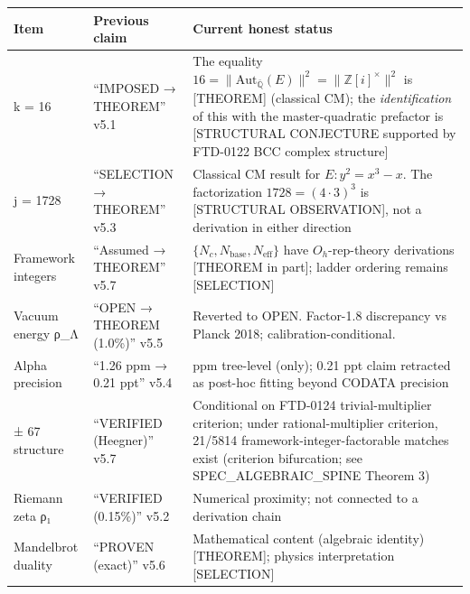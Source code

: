 \documentclass[
  11pt,
  letterpaper,
  twoside,
  openany]{book}
\begin{document}
\begin{longtable}[]{@{}
  >{\raggedright\arraybackslash}p{}
  >{\raggedright\arraybackslash}p{}
  >{\raggedright\arraybackslash}p{}@{}}
\toprule\noalign{}
\begin{minipage}[b]{\linewidth}\raggedright
Item
\end{minipage} & \begin{minipage}[b]{\linewidth}\raggedright
Previous claim
\end{minipage} & \begin{minipage}[b]{\linewidth}\raggedright
Current honest status
\end{minipage} \\
\midrule\noalign{}
\endhead
\bottomrule\noalign{}
\endlastfoot
k = 16 & ``IMPOSED → THEOREM'' v5.1 & The equality
\(16 = \|\mathrm{Aut}_{\bar{\mathbb{Q}}}(E)\|^2 = \|\mathbb{Z}[i]^\times\|^2\)
is {[}THEOREM{]} (classical CM); the \emph{identification} of this with
the master-quadratic prefactor is {[}STRUCTURAL CONJECTURE supported by
FTD-0122 BCC complex structure{]} \\
j = 1728 & ``SELECTION → THEOREM'' v5.3 & Classical CM result for
\(E: y^2 = x^3 - x\). The factorization \(1728 = (4 \cdot 3)^3\) is
{[}STRUCTURAL OBSERVATION{]}, not a derivation in either direction \\
Framework integers & ``Assumed → THEOREM'' v5.7 &
\(\{N_c, N_\mathrm{base}, N_\mathrm{eff}\}\) have \(O_h\)-rep-theory
derivations {[}THEOREM in part{]}; ladder ordering remains
{[}SELECTION{]} \\
Vacuum energy ρ\_Λ & ``OPEN → THEOREM (1.0\%)'' v5.5 & Reverted to OPEN.
Factor-1.8 discrepancy vs Planck 2018; calibration-conditional. \\
Alpha precision & ``1.26 ppm → 0.21 ppt'' v5.4 & 1.26 ppm tree-level
(only); 0.21 ppt claim retracted as post-hoc fitting beyond CODATA
precision \\
70 ± 67 structure & ``VERIFIED (Heegner)'' v5.7 & Conditional on
FTD-0124 trivial-multiplier criterion; under rational-multiplier
criterion, 21/5814 framework-integer-factorable matches exist (criterion
bifurcation; see SPEC\_ALGEBRAIC\_SPINE Theorem 3) \\
Riemann zeta ρ₁ & ``VERIFIED (0.15\%)'' v5.2 & Numerical proximity; not
connected to a derivation chain \\
Mandelbrot duality & ``PROVEN (exact)'' v5.6 & Mathematical content
(algebraic identity) {[}THEOREM{]}; physics interpretation
{[}SELECTION{]} \\
\end{longtable}
\end{document}
